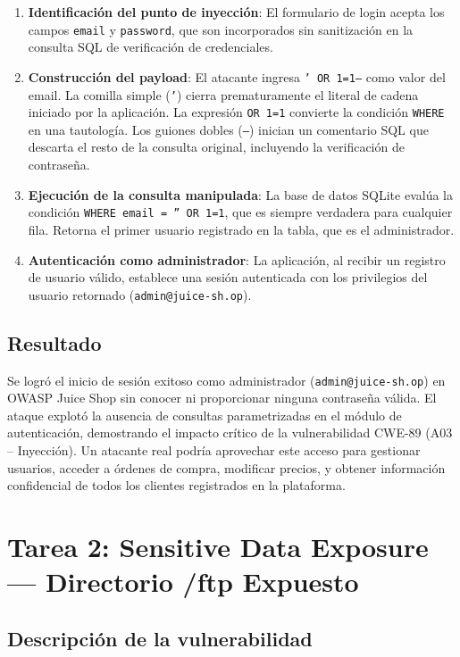 \documentclass[12pt, letterpaper]{article}
\begin{document}
\begin{enumerate}
  \item \textbf{Identificación del punto de inyección}: El formulario de login acepta los campos \texttt{email} y \texttt{password}, que son incorporados sin sanitización en la consulta SQL de verificación de credenciales.
  \item \textbf{Construcción del payload}: El atacante ingresa \texttt{' OR 1=1--} como valor del email. La comilla simple (\texttt{'}) cierra prematuramente el literal de cadena iniciado por la aplicación. La expresión \texttt{OR 1=1} convierte la condición \texttt{WHERE} en una tautología. Los guiones dobles (\texttt{--}) inician un comentario SQL que descarta el resto de la consulta original, incluyendo la verificación de contraseña.
  \item \textbf{Ejecución de la consulta manipulada}: La base de datos SQLite evalúa la condición \texttt{WHERE email = '' OR 1=1}, que es siempre verdadera para cualquier fila. Retorna el primer usuario registrado en la tabla, que es el administrador.
  \item \textbf{Autenticación como administrador}: La aplicación, al recibir un registro de usuario válido, establece una sesión autenticada con los privilegios del usuario retornado (\texttt{admin@juice-sh.op}).
\end{enumerate}

\subsection{Resultado}

Se logró el inicio de sesión exitoso como administrador (\texttt{admin@juice-sh.op}) en OWASP Juice Shop sin conocer ni proporcionar ninguna contraseña válida. El ataque explotó la ausencia de consultas parametrizadas en el módulo de autenticación, demostrando el impacto crítico de la vulnerabilidad CWE-89 (A03 -- Inyección). Un atacante real podría aprovechar este acceso para gestionar usuarios, acceder a órdenes de compra, modificar precios, y obtener información confidencial de todos los clientes registrados en la plataforma.

\section{Tarea 2: Sensitive Data Exposure --- Directorio /ftp Expuesto}

\subsection{Descripción de la vulnerabilidad}
\end{document}
